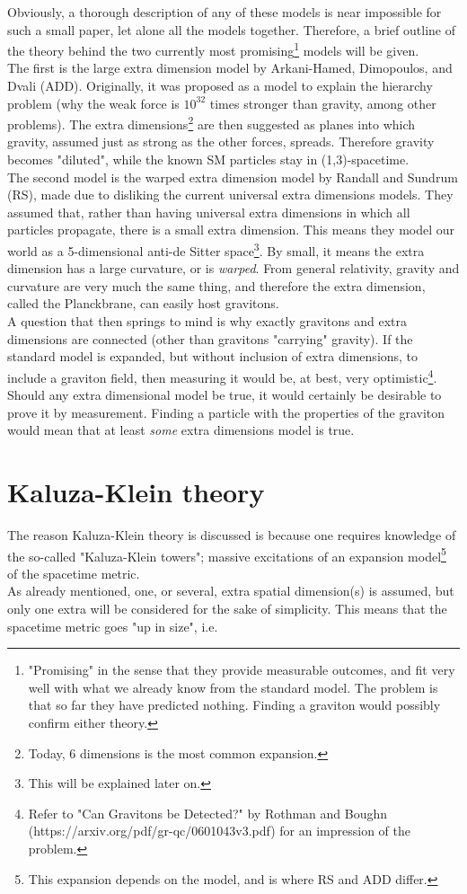 \documentclass[11pt,a4paper]{article}
\begin{document}
Obviously, a thorough description of any of these models is near impossible for such a small paper, let alone all the models together. Therefore, a brief outline of the theory behind the two currently most promising\footnote{"Promising" in the sense that they provide measurable outcomes, and fit very well with what we already know from the standard model. The problem is that so far they have predicted nothing. Finding a graviton would possibly confirm either theory.} models will be given.\\
The first is the large extra dimension model by Arkani-Hamed, Dimopoulos, and Dvali (ADD). Originally, it was proposed as a model to explain the hierarchy problem (why the weak force is $10^{32}$ times stronger than gravity, among other problems). The extra dimensions\footnote{Today, 6 dimensions is the most common expansion.} are then suggested as planes into which gravity, assumed just as strong as the other forces, spreads. Therefore gravity becomes "diluted", while the known SM particles stay in (1,3)-spacetime.\\
The second model is the warped extra dimension model by Randall and Sundrum (RS), made due to disliking the current universal extra dimensions models. They assumed that, rather than having universal extra dimensions in which all particles propagate,  there is a small extra dimension. This means they model our world as a 5-dimensional anti-de Sitter space\footnote{This will be explained later on.}. By small, it means the extra dimension has a large curvature, or is \emph{warped}. From general relativity, gravity and curvature are very much the same thing, and therefore the extra dimension, called the Planckbrane, can easily host gravitons.\\
A question that then springs to mind is why exactly gravitons and extra dimensions are connected (other than gravitons "carrying" gravity). If the standard model is expanded, but without inclusion of extra dimensions, to include a graviton field, then measuring it would be, at best, very optimistic\footnote{Refer to "Can Gravitons be Detected?" by Rothman and Boughn (https://arxiv.org/pdf/gr-qc/0601043v3.pdf) for an impression of the problem.}.
Should any extra dimensional model be true, it would certainly be desirable to prove it by measurement. Finding a particle with the properties of the graviton would mean that at least \emph{some} extra dimensions model is true.

\section{Kaluza-Klein theory}
The reason Kaluza-Klein theory is discussed is because one requires knowledge of the so-called "Kaluza-Klein towers"; massive excitations of an expansion model\footnote{This expansion depends on the model, and is where RS and ADD differ.} of the spacetime metric.\\
As already mentioned, one, or several, extra spatial dimension(s) is assumed, but only one extra will be considered for the sake of simplicity. This means that the spacetime metric goes "up in size", i.e.
\end{document}
